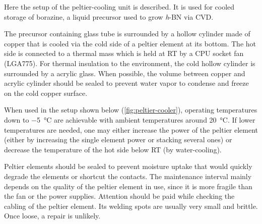 \label{sec:borazine-cooler}
Here the setup of the peltier-cooling unit is described. It is used for cooled  storage of borazine, a liquid precursor used to grow \textit{h}-BN via CVD.

The precursor containing glass tube is surrounded by a hollow cylinder made of copper that is cooled via the cold side of a peltier element at its bottom. The hot side is connected to a thermal mass which is held at RT by a CPU socket fan (LGA775). For thermal insulation to the environment, the cold hollow cylinder is surrounded by a acrylic glass. When possible, the volume between copper and acrylic cylinder should be sealed to prevent water vapor to condense and freeze on the cold copper surface. 

When used in the setup shown below (\autoref{fig:peltier-cooler}), operating temperatures down to \SI{-5}{\celsius} are achievable with ambient temperatures around \SI{20}{\celsius}. If lower temperatures are needed, one may either increase the power of the peltier element (either by increasing the single element power or stacking several ones) or decrease the temperature of the hot side below RT (by water-cooling).

Peltier elements should be sealed to prevent moisture uptake that would quickly degrade the elements or shortcut the contacts. The maintenance interval mainly depends on the quality of the peltier element in use, since it is more fragile than the fan or the power supplies. Attention should be paid while checking the cabling of the peltier element. Its welding spots are usually very small and brittle. Once loose, a repair is 
unlikely.


